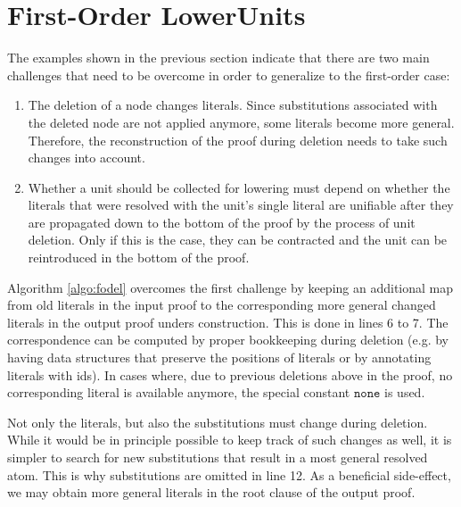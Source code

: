 

\section{First-Order LowerUnits} \label{sec:FOLU}

The examples shown in the previous section indicate that there are two main challenges that need to be overcome in order to generalize \LowerUnits to the first-order case:
\begin{enumerate}
\item The deletion of a node changes literals. Since substitutions associated with the deleted node are not applied anymore, some literals become more general. Therefore, the reconstruction of the proof during deletion needs to take such changes into account.
\item Whether a unit should be collected for lowering must depend on whether the literals that were resolved with the unit's single literal are unifiable after they are propagated down to the bottom of the proof by the process of unit deletion. Only if this is the case, they can be contracted and the unit can be reintroduced in the bottom of the proof.
\end{enumerate}

\newcommand{\none}{\texttt{none}}

\noindent
Algorithm \ref{algo:fodel} overcomes the first challenge by keeping an additional map from old literals in the input proof to the corresponding more general changed literals in the output proof unders construction. This is done in lines 6 to 7. The correspondence can be computed by proper bookkeeping during deletion (e.g. by having data structures that preserve the positions of literals or by annotating literals with ids). In cases where, due to previous deletions above in the proof, no corresponding literal is available anymore, the special constant $\none$ is used. 

Not only the literals, but also the substitutions must change during deletion. While it would be in principle possible to keep track of such changes as well, it is simpler to search for new substitutions that result in a most general resolved atom. This is why substitutions are omitted in line 12. As a beneficial side-effect, we may obtain more general literals in the root clause of the output proof.



\newcommand{\dl}[1]{#1^{\dagger}}

